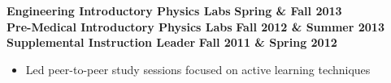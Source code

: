\documentclass[margin]{res}
\begin{document}
\begin{resume}
\textbf{Engineering Introductory Physics Labs} \hfill{} \textbf{Spring \& Fall 2013}\\
\textbf{Pre-Medical Introductory Physics Labs} \hfill{} \textbf{Fall 2012 \& Summer 2013}\\
{\bf Supplemental Instruction Leader} \hfill{} \textbf{Fall 2011 \& Spring 2012}
    \begin{itemize}\itemsep -2pt
    \item[] Led peer-to-peer study sessions focused on active learning techniques
    \end{itemize}


\begin{comment}
year |   Fall        | Spring        | Summer
1st  | Labs-premed   | labs-eng      | labs-premed
2nd  | Labs-eng      | RA            | RA
3rd  | RA/IntroAstro | Peter's intro | RA
4th  | IntroAstro    | Python        | RA
5th  | Physics C HW  | RA            | RA & REU classes
6th  | Fellowship (GRE Class) | Python | NA!?!
\end{comment}











\end{resume}
\end{document}
